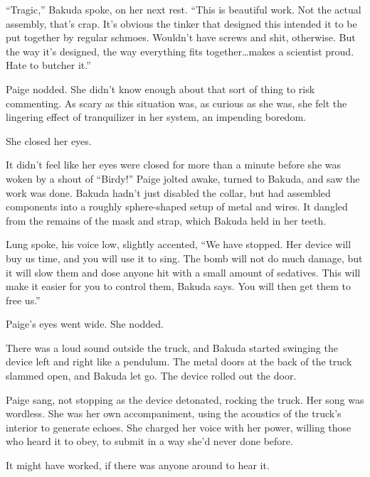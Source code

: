 ``Tragic,'' Bakuda spoke, on her next rest.  ``This is beautiful work.  Not the actual assembly, that's crap.  It's obvious the tinker that designed this intended it to be put together by regular schmoes.  Wouldn't have screws and shit, otherwise.  But the way it's designed, the way everything fits together\ldots makes a scientist proud.  Hate to butcher it.''



Paige nodded.  She didn't know enough about that sort of thing to risk commenting.  As scary as this situation was, as curious as she was, she felt the lingering effect of tranquilizer in her system, an impending boredom.



She closed her eyes.



It didn't feel like her eyes were closed for more than a minute before she was woken by a shout of ``Birdy!''  Paige jolted awake, turned to Bakuda, and saw the work was done.  Bakuda hadn't just disabled the collar, but had assembled components into a roughly sphere-shaped setup of metal and wires.  It dangled from the remains of the mask and strap, which Bakuda held in her teeth.



Lung spoke, his voice low, slightly accented, ``We have stopped.  Her device will buy us time, and you will use it to sing.  The bomb will not do much damage, but it will slow them and dose anyone hit with a small amount of sedatives.  This will make it easier for you to control them, Bakuda says.  You will then get them to free us.''



Paige's eyes went wide.  She nodded.



There was a loud sound outside the truck, and Bakuda started swinging the device left and right like a pendulum.  The metal doors at the back of the truck slammed open, and Bakuda let go.  The device rolled out the door.



Paige sang, not stopping as the device detonated, rocking the truck.  Her song was wordless.  She was her own accompaniment, using the acoustics of the truck's interior to generate echoes.  She charged her voice with her power, willing those who heard it to obey, to submit in a way she'd never done before.



It might have worked, if there was anyone around to hear it.



